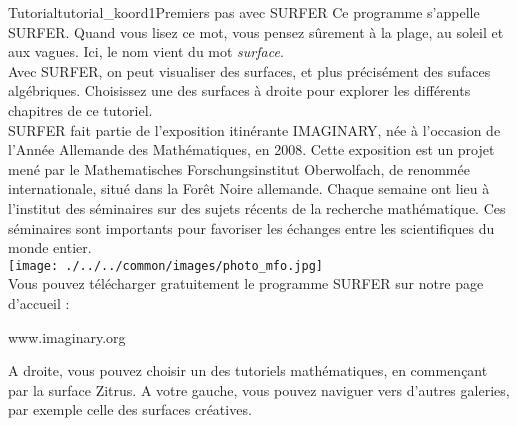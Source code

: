 \begin{surferIntroPage}{Tutorial}{tutorial_koord1}{Premiers pas avec SURFER}
Ce programme s'appelle SURFER. Quand vous lisez ce mot, vous pensez sûrement à la plage, au soleil et aux vagues. Ici, le nom vient du mot {\it surface}.
\\
Avec SURFER, on peut visualiser des surfaces, et plus précisément des sufaces algébriques. Choisissez une des surfaces à droite pour explorer les différents chapitres de ce tutoriel.\\
SURFER fait partie de l'exposition itinérante IMAGINARY, née à l'occasion de l'Année Allemande des Mathématiques, en 2008. Cette exposition est un projet mené par le Mathematisches Forschungsinstitut Oberwolfach, de renommée internationale, situé dans la Forêt Noire allemande. Chaque semaine ont lieu à l'institut des séminaires sur des sujets récents de la recherche mathématique. Ces séminaires sont importants pour favoriser les échanges entre les scientifiques du monde entier. \\
\vspace{0.2cm} \hspace{3.5cm}\texttt{[image: ./../../common/images/photo\_mfo.jpg]}\\
Vous pouvez télécharger gratuitement le programme SURFER sur notre page d'accueil :\\
\begin{centering}
www.imaginary.org\\
\end{centering}
 \vspace{0.2cm}
A droite, vous pouvez choisir un des tutoriels mathématiques, en commençant par la surface Zitrus. A votre gauche, vous pouvez naviguer vers d'autres galeries, par exemple celle des surfaces créatives.
\end{surferIntroPage}

